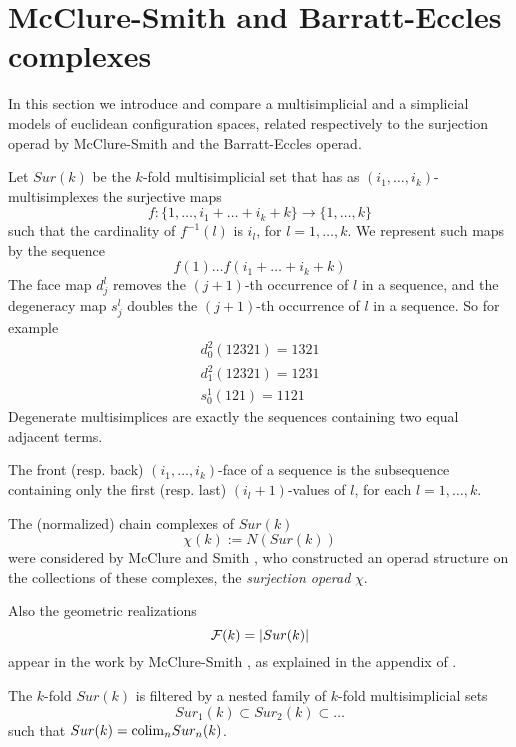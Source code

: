 
\section{McClure-Smith and Barratt-Eccles  complexes } 

In this section we introduce and compare a  multisimplicial and a simplicial  models of euclidean configuration spaces,
related respectively to the surjection operad by McClure-Smith and the Barratt-Eccles operad.

\begin{definition}
Let $Sur(k)$  be the $k$-fold multisimplicial set that has 
as $(i_1,\dots,i_k)$-multisimplexes
the surjective maps $$f:\{1,\dots,i_1+\dots+i_k+k\} \to  \{1,\dots,k\}$$ such that
the cardinality of $f^{-1}(l)$ is $i_l$, for $l=1,\dots,k$. We represent such maps by the sequence
$$f(1) \dots f(i_1+\dots+i_k+k)$$
The face map
$d^l_j$ removes the $(j+1)$-th occurrence of $l$ in a sequence, and the degeneracy map
$s^l_j$ doubles the $(j+1)$-th occurrence of $l$ in a sequence. 
So for example 
\begin{align*}d^2_0(12321)=1321 \\ d^2_1(12321)=1231 \\ s^1_0(121)=1121
\end{align*}
Degenerate multisimplices are exactly the sequences containing two equal adjacent terms.

The front  (resp. back) $(i_1,\dots,i_k)$-face of a sequence is the subsequence containing only the first (resp. last) 
$(i_l+1)$-values of $l$, for each
$l=1,\dots,k$.
\end{definition}


The (normalized) chain complexes 
of $Sur(k)$  $$\chi(k):=N(Sur(k))$$
were considered by McClure and Smith
\cite{MS},
who constructed an operad structure
on the collections of these complexes, the {\it surjection operad} $\chi$.


Also the geometric realizations 
$$\mathcal{F}(k)=\lvert Sur(k)\rvert$$ appear in the work by McClure-Smith \cite{MS}, as explained in the appendix of \cite{Deligne}.   

The $k$-fold  $Sur(k)$ is filtered
by a nested family of $k$-fold multisimplicial sets
$$Sur_1(k) \subset Sur_2(k)  \subset \dots $$ such that $Sur(k) = {\rm colim}_n Sur_n(k)$. 


